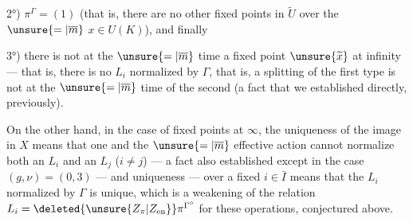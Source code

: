 2°) $\pi^\Gamma=(1)$ (that is, there are no other fixed points in $\widetilde U$ over the $\unsure{=|\overline m}$ $x\in U(K)$), and finally

3°) there is not at the $\unsure{=|\overline m}$ time a fixed point $\unsure{\widetilde x}$ at infinity --- that is, there is no $L_i$ normalized by $\Gamma$, that is, a splitting of the first type is not at the $\unsure{=|\overline m}$ time of the second (a fact that we established directly, previously).


On the other hand, in the case of fixed points at $\infty$, the uniqueness of the image in $X$ means that one and the $\unsure{=|\overline m}$ effective action cannot normalize both an $L_i$ and an $L_j$ ($i\ne j$) --- a fact also established except in the case $(g,\nu)=(0,3)$ --- and uniqueness --- over a fixed $i\in\bar I$ means that the $L_i$  normalized by $\Gamma$ is unique, which is a weakening of the relation $L_i=\deleted{\unsure{Z_\pi|Z_{\mathrm{en}}}}\pi^{\Gamma^\circ}$ for these operations, conjectured above.
